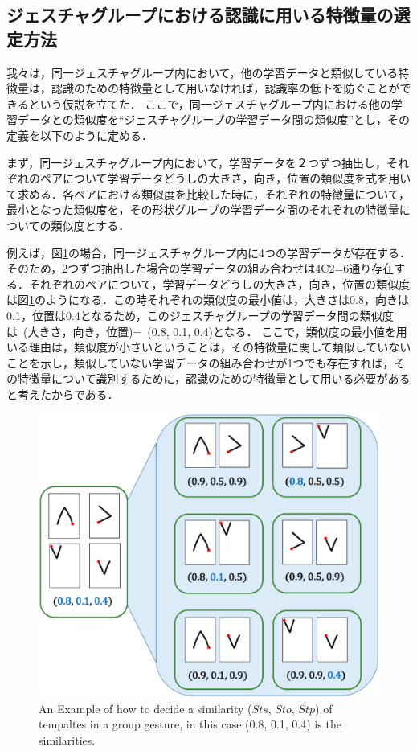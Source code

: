 \subsection{ジェスチャグループにおける認識に用いる特徴量の選定方法}
我々は，同一ジェスチャグループ内において，他の学習データと類似している特徴量は，認識のための特徴量として用いなければ，認識率の低下を防ぐことができるという仮説を立てた．
ここで，同一ジェスチャグループ内における他の学習データとの類似度を``ジェスチャグループの学習データ間の類似度''とし，その定義を以下のように定める．

まず，同一ジェスチャグループ内において，学習データを２つずつ抽出し，それぞれのペアについて学習データどうしの大きさ，向き，位置の類似度を式を用いて求める．各ペアにおける類似度を比較した時に，それぞれの特徴量について，最小となった類似度を，その形状グループの学習データ間のそれぞれの特徴量についての類似度とする．

例えば，図\ref{fig:group_similarity}の場合，同一ジェスチャグループ内に4つの学習データが存在する．そのため，2つずつ抽出した場合の学習データの組み合わせは{\scriptsize 4}C{\scriptsize 2}=6通り存在する．それぞれのペアについて，学習データどうしの大きさ，向き，位置の類似度は図\ref{fig:group_similarity}のようになる．この時それぞれの類似度の最小値は，大きさは0.8，向きは0.1，位置は0.4となるため，このジェスチャグループの学習データ間の類似度は~(大きさ，向き，位置)=~(0.8, 0.1, 0.4)となる．
ここで，類似度の最小値を用いる理由は，類似度が小さいということは，その特徴量に関して類似していないことを示し，類似していない学習データの組み合わせが1つでも存在すれば，その特徴量について識別するために，認識のための特徴量として用いる必要があると考えたからである．

\begin{figure} [h!]
	\begin{center}
		\includegraphics [width=0.8\hsize ]{img/group_similarity.eps}
	\end{center}
	\caption{An Example of how to decide a similarity ($Sts$, $Sto$, $Stp$) of tempaltes in a group gesture, in this case (0.8, 0.1, 0.4) is the similarities.}
	\label{fig:group_similarity}
\end{figure}

